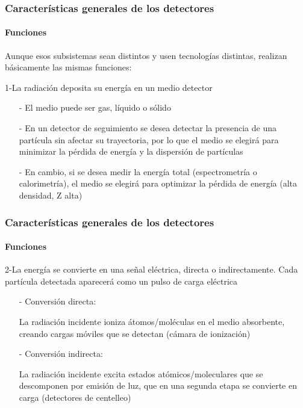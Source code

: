 \documentclass{beamer}
\begin{document}
\begin{frame}
\frametitle{Características generales de los detectores}
\framesubtitle{{\color{blue}Funciones}}
\begin{exampleblock}{}
Aunque esos subsistemas sean distintos y usen tecnologías
distintas, realizan básicamente las mismas funciones:
\end{exampleblock}
\begin{block}{1-La radiación deposita su energía en un medio detector}
\begin{itemize}
\item[-] El medio puede ser {\color[rgb]{0.82,0.1,0.26}gas, líquido o sólido}

\item[-] En un detector de seguimiento se desea detectar la presencia de una partícula
sin afectar su trayectoria, por lo que \alert{el medio se elegirá para minimizar la
pérdida de energía y la dispersión de partículas}

\item[-]En cambio, si se desea medir la energía total (espectrometría o calorimetría),
el medio se elegirá para optimizar la pérdida de energía (alta densidad, Z alta)
\end{itemize}
\end{block}
\end{frame} 

\begin{frame}
\frametitle{Características generales de los detectores}
\framesubtitle{{\color{blue}Funciones}}
\begin{block}{2-La energía se convierte en una señal eléctrica, directa o
indirectamente. Cada partícula detectada aparecerá como un pulso de carga
eléctrica}
\begin{itemize}
\item[-] {\color[rgb]{0.5,0,0.13}Conversión directa:}

La radiación incidente ioniza átomos/moléculas en el medio absorbente,
creando cargas móviles que se detectan (cámara de ionización)

\item[-] {\color[rgb]{0.5,0,0.13}Conversión indirecta:}

La radiación incidente excita estados atómicos/moleculares que se descomponen
por emisión de luz, que en una segunda etapa se convierte en carga (detectores
de centelleo)
\end{itemize}
\end{block}
\end{frame} 
\end{document}
